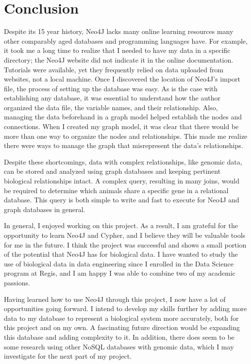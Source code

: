 \documentclass[]{article}
\begin{document}
\section{Conclusion}
Despite its 15 year history, Neo4J lacks many online learning resources many other comparably aged databases and programming languages have.  For example, it took me a long time to realize that I needed to have my data in a specific directory; the Neo4J website did not indicate it in the online documentation.  Tutorials were available, yet they frequently relied on data uploaded from websites, not a local machine.  Once I discovered the location of Neo4J’s import file, the process of setting up the database was easy.  As is the case with establishing any database, it was essential to understand how the author organized the data file, the variable names, and their relationship.  Also, managing the data beforehand in a graph model helped establish the nodes and connections.  When I created my graph model, it was clear that there would be more than one way to organize the nodes and relationships.  This made me realize there were ways to manage the graph that misrepresent the data's relationships.

Despite these shortcomings, data with complex relationships, like genomic data, can be stored and analyzed using graph databases and keeping pertinent biological relationships intact.  A complex query, resulting in many joins, would be required to determine which animals share a specific gene in a relational database.  This query is both simple to write and fast to execute for Neo4J and graph databases in general.

In general, I enjoyed working on this project.  As a result, I am grateful for the opportunity to learn Neo4J and Cypher, and I believe they will be valuable tools for me in the future.  I think the project was successful and shows a small portion of the potential that Neo4J has for biological data. I have wanted to study the use of biological data in data engineering since I enrolled in the Data Science program at Regis, and I am happy I was able to combine two of my academic passions.

Having learned how to use Neo4J through this project, I now have a lot of opportunities going forward.  I intend to develop my skills further by adding more data to my database to represent a biological system more accurately, both for this project and on my own. A fascinating future direction would be expanding this database and adding complexity to it. In addition, there does seem to be some research using other NoSQL databases with genomic data, which I may investigate for the next part of my project.
\end{document}
